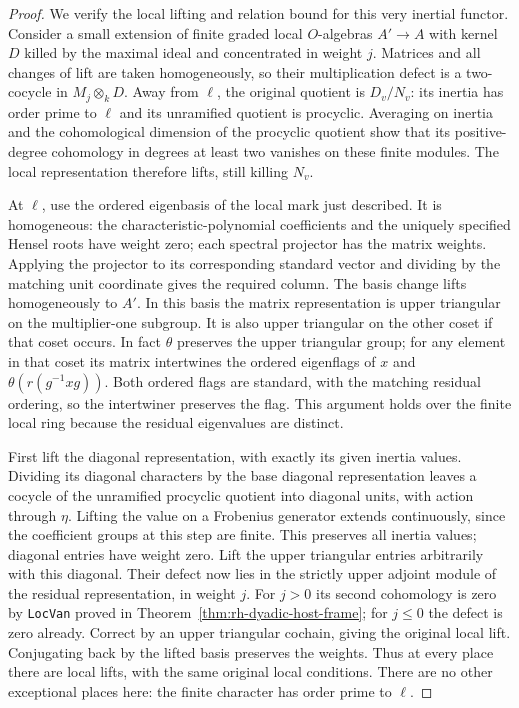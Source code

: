 \begin{proof}
We verify the local lifting and relation bound for this very
inertial functor. Consider a small extension of finite graded local
$O$-algebras $A'\to A$ with kernel $D$ killed by the maximal ideal
and concentrated in weight $j$. Matrices and all changes of lift
are taken homogeneously, so their multiplication defect is a
two-cocycle in $M_j\otimes_kD$.
Away from $\ell$, the original quotient is $D_v/N_v$:
its inertia has order prime to $\ell$ and its unramified quotient
is procyclic. Averaging on inertia and the cohomological dimension
of the procyclic quotient show that its positive-degree cohomology
in degrees at least two vanishes on these finite modules.
The local representation therefore lifts, still killing $N_v$.

At $\ell$, use the ordered eigenbasis of the local mark just
described. It is homogeneous: the characteristic-polynomial
coefficients and the uniquely specified Hensel roots have weight
zero; each spectral projector has the matrix weights. Applying
the projector to its corresponding standard vector and dividing
by the matching unit coordinate gives the required column.
The basis change lifts homogeneously to $A'$.
In this basis the matrix representation is upper triangular on
the multiplier-one subgroup. It is also upper triangular on the
other coset if that coset occurs. In fact $\theta$ preserves the
upper triangular group; for any element in that coset its
matrix intertwines the ordered eigenflags of $x$ and
$\theta(r(g^{-1}xg))$. Both ordered flags are standard, with
the matching residual ordering, so the intertwiner preserves
the flag. This argument holds over the finite local ring because
the residual eigenvalues are distinct.

First lift the diagonal representation, with exactly its given
inertia values. Dividing its diagonal characters by the base
diagonal representation leaves a cocycle of the unramified
procyclic quotient into diagonal units, with action through
$\eta$. Lifting the value on a Frobenius generator extends
continuously, since the coefficient groups at this step are
finite. This preserves all inertia values; diagonal entries
have weight zero. Lift the upper triangular entries arbitrarily
with this diagonal. Their defect now lies in the strictly upper
adjoint module of the residual representation, in weight $j$.
For $j>0$ its second cohomology is zero by \texttt{LocVan}
proved in Theorem~\ref{thm:rh-dyadic-host-frame}; for $j\le0$
the defect is zero already. Correct by an upper triangular
cochain, giving the original local lift. Conjugating back by the
lifted basis preserves the weights. Thus at every place there
are local lifts, with the same original local conditions.
There are no other exceptional places here: the finite character
has order prime to $\ell$.


\end{proof}
